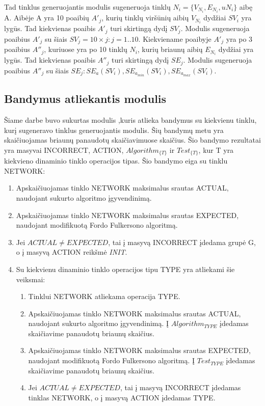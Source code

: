Tad tinklus generuojantis modulis sugeneruoja tinklų $N_i = \{V_{N_i}, E_{N_i}, u{N_i}\}$ aibę A. Aibėje A yra 10 poaibių $A'_j$, kurių tinklų viršūnių aibių $V_{N_i}$ dydžiai $SV_i$ yra lygūs. Tad kiekvienas poaibis  $A'_j$ turi skirtingą dydį  $SV_j$. Modulis sugeneruoja poaibius $A'_j$ su šiais $SV_j = 10 \times j : j = 1 .. 10$. Kiekviename poaibyje $A'_j$ yra po 3 poaibius $A''_j$, kuriuose yra po 10 tinklų $N_i$, kurių briaunų aibių $E_{N_i}$ dydžiai yra lygūs. Tad kiekvienas poaibis  $A''_j$ turi skirtingą dydį  $SE_j$. Modulis sugeneruoja poaibius $A''_j$ su šiais  $SE_j : SE_{a}(SV_i), SE_{a_{min}}(SV_i) , SE_{a_{max}}(SV_i)$.

\subsection{Bandymus atliekantis modulis}

Šiame darbe buvo sukurtas modulis ,kuris atlieka bandymus su kiekvienu tinklu, kurį sugeneravo tinklus generuojantis modulis. Šių bandymų metu yra skaičiuojamas briaunų panaudotų skaičiavimuose skaičius. Šio bandymo rezultatai yra masyvai INCORRECT, ACTION, $Algorithm_{\{T\}}$ ir $Test_{\{T\}}$, kur T yra kiekvieno dinaminio tinklo operacijos tipas. Šio bandymo eiga su tinklu NETWORK:

\begin{enumerate}
	\item Apskaičiuojamas tinklo NETWORK maksimalus srautas ACTUAL, naudojant sukurto algoritmo įgyvendinimą.
	\item Apskaičiuojamas tinklo NETWORK maksimalus srautas EXPECTED, naudojant modifikuotą Fordo Fulkersono algoritmą.
	\item Jei $ACTUAL \neq EXPECTED$, tai į masyvą INCORRECT įdedama grupė G, o į masyvą ACTION reikšmė \textit{INIT}.
	\item Su kiekvienu dinaminio tinklo operacijos tipu TYPE yra atliekami šie veiksmai:
	\begin{enumerate}
		\item Tinklui NETWORK atliekama operacija TYPE.
		\item Apskaičiuojamas tinklo NETWORK maksimalus srautas ACTUAL, naudojant sukurto algoritmo įgyvendinimą. Į $Algorithm_{TYPE}$ įdedamas skaičiavime panaudotų briaunų skaičius.
		\item Apskaičiuojamas tinklo NETWORK maksimalus srautas EXPECTED, naudojant modifikuotą Fordo Fulkersono algoritmą. Į $Test_{TYPE}$ įdedamas skaičiavime panaudotų briaunų skaičius.
		\item Jei $ACTUAL \neq EXPECTED$, tai į masyvą INCORRECT įdedamas tinklas NETWORK, o į masyvą ACTION įdedamas TYPE.
	\end{enumerate}

\end{enumerate}

